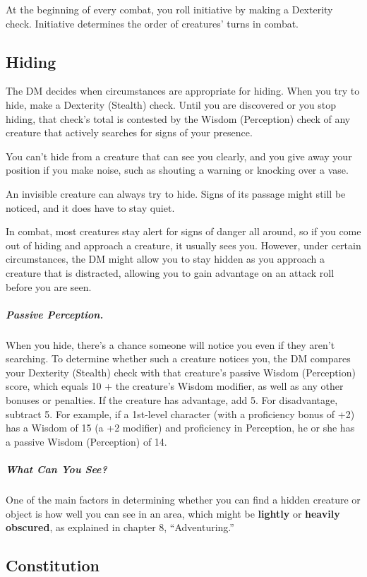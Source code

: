 At the beginning of every combat, you roll initiative by making a Dexterity check. Initiative determines the order of creatures' turns in combat.

\begin{aside}
\subsection{Hiding}

The DM decides when circumstances are appropriate for hiding. When you try to hide, make a Dexterity (Stealth) check. Until you are discovered or you stop hiding, that check's total is contested by the Wisdom (Perception) check of any creature that actively searches for signs of your presence.

You can't hide from a creature that can see you clearly, and you give away your position if you make noise, such as shouting a warning or knocking over a vase.

An invisible creature can always try to hide. Signs of its passage might still be noticed, and it does have to stay quiet.

In combat, most creatures stay alert for signs of danger all around, so if you come out of hiding and approach a creature, it usually sees you. However, under certain circumstances, the DM might allow you to stay hidden as you approach a creature that is distracted, allowing you to gain advantage on an attack roll before you are seen.

\subparagraph*{Passive Perception.} When you hide, there's a chance someone will notice you even if they aren't searching. To determine whether such a creature notices you, the DM compares your Dexterity (Stealth) check with that creature's passive Wisdom (Perception) score, which equals 10 + the creature's Wisdom modifier, as well as any other bonuses or penalties. If the creature has advantage, add 5. For disadvantage, subtract 5. For example, if a 1st-level character (with a proficiency bonus of +2) has a Wisdom of 15 (a +2 modifier) and proficiency in Perception, he or she has a passive Wisdom (Perception) of 14.

\subparagraph*{What Can You See?} One of the main factors in determining whether you can find a hidden creature or object is how well you can see in an area, which might be \textbf{lightly} or \textbf{heavily obscured}, as explained in chapter 8, “Adventuring.”
\end{aside}

\subsection{Constitution}

